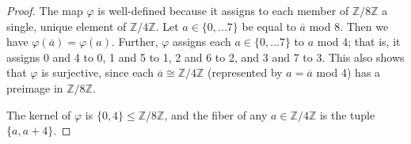 \documentclass{article}
\begin{document}
\begin{proof}
    The map $\varphi$ is well-defined because it assigns to each member of $\mathbb{Z}/8\mathbb{Z}$ a single, unique element of $\mathbb{Z}/4\mathbb{Z}$. Let $a \in \{ 0, ... 7 \}$ be equal to $\overline{a}$ mod 8. Then we have $\varphi(\overline{a}) = \varphi(a)$. Further, $\varphi$ assigns each $a \in \{ 0, ... 7 \}$ to $a$ mod 4; that is, it assigns 0 and 4 to 0, 1 and 5 to 1, 2 and 6 to 2, and 3 and 7 to 3. This also shows that $\varphi$ is surjective, since each $\overline{a} \cong \mathbb{Z}/4\mathbb{Z}$ (represented by $a = \overline{a}$ mod 4) has a preimage in $\mathbb{Z}/8\mathbb{Z}$.

    The kernel of $\varphi$ is $\{ 0, 4 \} \leq \mathbb{Z}/8\mathbb{Z}$, and the fiber of any $a \in \mathbb{Z}/4\mathbb{Z}$ is the tuple $\{ a, a + 4 \}$.
\end{proof}
\end{document}
